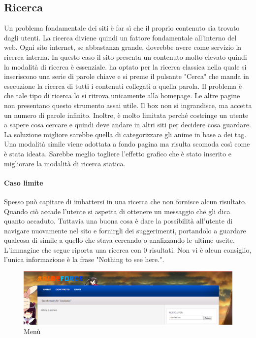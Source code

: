 \subsection{Ricerca} \label{Ricerca}
Un problema fondamentale dei siti è far sì che il proprio contenuto sia trovato dagli utenti. La ricerca diviene quindi un fattore fondamentale all'interno del web. Ogni sito internet, se abbastanza grande, dovrebbe avere come servizio la ricerca interna. In questo caso il sito presenta un contenuto molto elevato quindi la modalità di ricerca è essenziale.
\nomeSito ha optato per la ricerca classica nella quale si inseriscono una serie di parole chiave e si preme il pulsante "Cerca" che manda in esecuzione la ricerca di tutti i contenuti collegati a quella parola.
Il problema è che tale tipo di ricerca lo si ritrova unicamente alla homepage. Le altre pagine non presentano questo strumento assai utile. Il box non si ingrandisce, ma accetta un numero di parole infinito. Inoltre, è molto limitata perché costringe un utente a sapere cosa cercare e quindi deve andare in altri siti per decidere cosa guardare. La soluzione migliore sarebbe quella di categorizzare gli anime in base a dei tag. Una modalità simile viene adottata a fondo pagina ma risulta scomoda così come è stata ideata. Sarebbe meglio togliere l'effetto grafico che è stato inserito e migliorare la modalità di ricerca statica.

\paragraph{Caso limite}
Spesso può capitare di imbattersi in una ricerca che non fornisce alcun risultato. Quando ciò accade l'utente si aspetta di ottenere un messaggio che gli dica quanto accaduto. Tuttavia una buona cosa è dare la possibilità all'utente di navigare nuovamente nel sito e fornirgli dei suggerimenti, portandolo a guardare qualcosa di simile a quello che stava cercando o analizzando le ultime uscite. L'immagine che segue riporta una ricerca con 0 risultati. Non vi è alcun consiglio, l'unica informazione è  la frase "Nothing to see here.". 

\begin{figure}[H]
	\centering
	\includegraphics[width=1\textwidth]{img/CasoLimite.png}
	\caption{Menù} 
	\label{img5} 
\end{figure}
